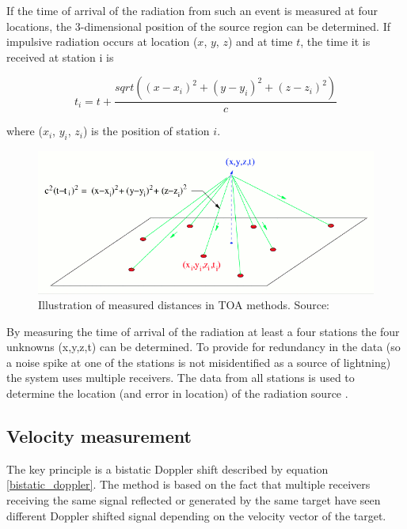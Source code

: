 \documentclass[twoside]{ctuthesis}
\theoremstyle{plain}
\theoremstyle{definition}
\theoremstyle{note}
\begin{document}
If the time of arrival of the radiation from such an event is measured at four locations, the 3-dimensional position of the source region can be determined. If impulsive radiation occurs at location ($x$, $y$, $z$) and at time $t$, the time it is received at station i is 

\begin{equation}
t_i = t+ \frac{sqrt( (x-x_i)^2 + (y-y_i)^2 +(z-z_i)^2)}{c} \label{toa}
\end{equation}

where ($x_i$, $y_i$, $z_i$) is the position of station $i$. 

\begin{figure}
 \begin{center}
 \includegraphics[width=\linewidth]{./img/toa_fig.png}
 \caption{Illustration of measured distances in TOA methods. Source: \cite{NMLMA} }
  \label{fig:TOA_localization} 
 \end{center}
\end{figure}

By measuring the time of arrival of the radiation at least a four stations the four unknowns (x,y,z,t) can be determined. To provide for redundancy in the data (so a noise spike at one of the stations is not misidentified as a source of lightning) the system uses multiple receivers. The data from all stations is used to determine the location (and error in location) of the radiation source \cite{NMLMA}.

\subsection{Velocity measurement}

The key principle is a bistatic Doppler shift described by equation \ref{bistatic_doppler}. The method is based on the fact that multiple receivers receiving the same signal reflected or generated by the same target have seen different Doppler shifted signal depending on the velocity vector of the target.  
\end{document}
